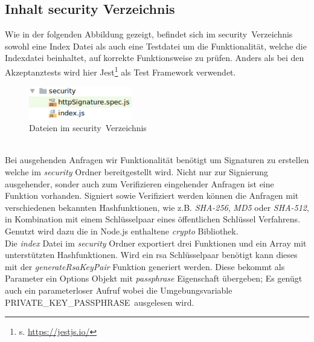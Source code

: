 \subsection{Inhalt security Verzeichnis}
Wie in der folgenden Abbildung gezeigt, befindet sich im \glqq security\grqq~Verzeichnis sowohl eine Index Datei als auch eine Testdatei um die Funktionalität, welche die Indexdatei beinhaltet, auf korrekte Funktionsweise zu prüfen. Anders als bei den Akzeptanztests wird hier Jest\footnote{s. \url{https://jestjs.io/}} als Test Framework verwendet.
\begin{figure}[h]
	\centering
	\includegraphics[width=4.5cm]{figures/security.png}
	\caption{Dateien im \glqq security\grqq~Verzeichnis}
	\label{fig:security}
\end{figure}\\
Bei ausgehenden Anfragen wir Funktionalität benötigt um Signaturen zu erstellen welche im \textit{security} Ordner bereitgestellt wird. Nicht nur zur Signierung ausgehender, sonder auch zum Verifizieren eingehender Anfragen ist eine Funktion vorhanden. Signiert sowie Verifiziert werden können die Anfragen mit verschiedenen bekannten Hashfunktionen, wie z.B. \textit{SHA-256}, \textit{MD5} oder \textit{SHA-512}, in Kombination mit einem Schlüsselpaar eines öffentlichen Schlüssel Verfahrens. Genutzt wird dazu die in Node.js enthaltene \textit{crypto} Bibliothek.\\

Die \textit{index} Datei im \textit{security} Ordner exportiert drei Funktionen und ein Array mit unterstützten Hashfunktionen. Wird ein \gls{rsa} Schlüsselpaar benötigt kann dieses mit der \textit{generateRsaKeyPair} Funktion generiert werden. Diese bekommt als Parameter ein Options Objekt mit \textit{passphrase} Eigenschaft übergeben; Es genügt auch ein parameterloser Aufruf wobei die Umgebungsvariable \glqq PRIVATE\_KEY\_PASSPHRASE\grqq~ausgelesen wird.\\

